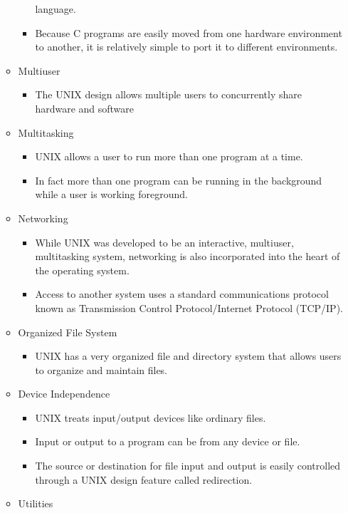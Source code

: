 \documentclass{article}
\begin{document}
\begin{enumerate}
\begin{itemize}
\begin{itemize}
							language.
						\item Because C programs are easily moved from one hardware environment to another, it
							is relatively simple to port it to different environments.
					\end{itemize}
				\item Multiuser
					\begin{itemize}
						\item The UNIX design allows multiple users to concurrently share hardware and software
					\end{itemize}
				\item Multitasking
					\begin{itemize}
						\item UNIX allows a user to run more than one program at a time.
						\item In fact more than one program can be running in the background while a user is
							working foreground.
					\end{itemize}
				\item Networking
					\begin{itemize}
						\item While UNIX was developed to be an interactive, multiuser, multitasking system,
							networking is also incorporated into the heart of the operating system.
						\item Access to another system uses a standard communications protocol known as
							Transmission Control Protocol/Internet Protocol (TCP/IP).
					\end{itemize}
				\item Organized File System
					\begin{itemize}
						\item UNIX has a very organized file and directory system that allows users to organize
							and maintain files.
					\end{itemize}
				\item Device Independence
					\begin{itemize}
						\item UNIX treats input/output devices like ordinary files.
						\item Input or output to a program can be from any device or file.
						\item The source or destination for file input and output is easily controlled through a
							UNIX design feature called redirection.
					\end{itemize}
				\item Utilities

\end{itemize}
\end{enumerate}
\end{document}
